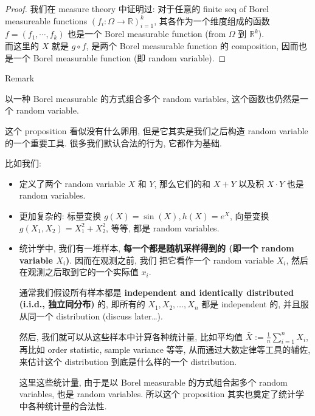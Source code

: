 \documentclass{qlnotes-export}
\begin{document}
\begin{proof}

我们在 measure theory 中证明过: 对于任意的 finite seq of Borel measureable functions \((f_{i}:\Omega\rightarrow{\mathbb{R}})_{i = 1}^{k}\), 其各作为一个维度组成的函数 \(f = (f_{1},\cdots,f_{k})\) 也是一个 Borel measurable function (from \(\Omega\) 到 \({\mathbb{R}}^{k}\)).\\
而这里的 \(X\) 就是 \(g \circ f\), 是两个 Borel measurable function 的 composition, 因而也是一个 Borel measurable function (即 random variable).

\end{proof}

\begin{qlremark}{Remark}

以一种 Borel measurable 的方式组合多个 random variables, 这个函数也仍然是一个 random variable.

这个 proposition 看似没有什么卵用, 但是它其实是我们之后构造 random variable 的一个重要工具. 很多我们默认合法的行为, 它都作为基础.

比如我们:

\begin{itemize}
\item
  定义了两个 random variable \(X\) 和 \(Y\), 那么它们的和 \(X + Y\) 以及积 \(X \cdot Y\) 也是 random variables.
\item
  更加复杂的: 标量变换 \(g(X) = \sin(X),h(X) = e^{X}\), 向量变换 \(g(X_{1},X_{2}) = X_{1}^{2} + X_{2}^{2}\), 等等, 都是 random variables.
\item
  统计学中, 我们有一堆样本, \textbf{每一个都是随机采样得到的 (即一个 random variable \(X_{i}\))}. 因而在观测之前, 我们 把它看作一个 random variable \(X_{i}\), 然后在观测之后取到它的一个实际值 \(x_{i}\).

  通常我们假设所有样本都是 \textbf{independent and identically distributed (i.i.d., 独立同分布)} 的, 即所有的 \(X_{1},X_{2},\ldots,X_{n}\) 都是 independent 的, 并且服从同一个 distribution (discuss later\ldots).

  然后, 我们就可以从这些样本中计算各种统计量, 比如平均值 \(\bar{X} := \frac{1}{n}\sum_{i = 1}^{n}X_{i}\), 再比如 order statistic, sample variance 等等, 从而通过大数定律等工具的辅佐, 来估计这个 distribution 到底是什么样的一个 distribution.

  这里这些统计量, 由于是以 Borel measurable 的方式组合起多个 random variables, 也是 random variables. 所以这个 proposition 其实也奠定了统计学中各种统计量的合法性.
\end{itemize}

\end{qlremark}
\end{document}
